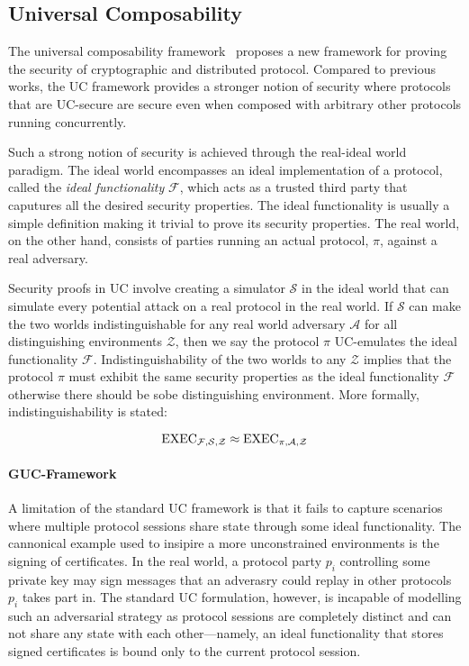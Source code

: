 \subsection{Universal Composability}
The universal composability framework~\cite{uc} proposes a new framework for proving the security of cryptographic and distributed protocol.
Compared to previous works, the UC framework provides a stronger notion of security where protocols that are UC-secure are secure even when composed with arbitrary other protocols running concurrently. 

Such a strong notion of security is achieved through the real-ideal world paradigm.
The ideal world encompasses an ideal implementation of a protocol, called the \textit{ideal functionality} $\mathcal{F}$, which acts as a trusted third party that caputures all the desired security properties.
The ideal functionality is usually a simple definition making it trivial to prove its security properties.
The real world, on the other hand, consists of parties running an actual protocol, $\pi$, against a real adversary.

Security proofs in UC involve creating a simulator $\mathcal{S}$ in the ideal world that can simulate every potential attack on a real protocol in the real world.
If $\mathcal{S}$ can make the two worlds indistinguishable for any real world adversary $\mathcal{A}$ for all distinguishing environments $\mathcal{Z}$, then we say the protocol $\pi$ UC-emulates the ideal functionality $\mathcal{F}$.
Indistinguishability of the two worlds to any $\mathcal{Z}$ implies that the protocol $\pi$ must exhibit the same security properties as the ideal functionality $\mathcal{F}$ otherwise there should be sobe distinguishing environment. 
More formally, indistinguishability is stated:

$$ \text{EXEC}_{\mathcal{F},\mathcal{S},\mathcal{Z}} \approx \text{EXEC}_{\pi,\mathcal{A},\mathcal{Z}} $$

\paragraph{GUC-Framework}
A limitation of the standard UC framework is that it fails to capture scenarios where multiple protocol sessions share state through some ideal functionality.
The cannonical example used to insipire a more unconstrained environments is the signing of certificates. 
In the real world, a protocol party $p_i$ controlling some private key may sign messages that an adverasry could replay in other protocols $p_i$ takes part in.
The standard UC formulation, however, is incapable of modelling such an adversarial strategy as protocol sessions are completely distinct and can not share any state with each other---namely, an ideal functionality that stores signed certificates is bound only to the current protocol session.


